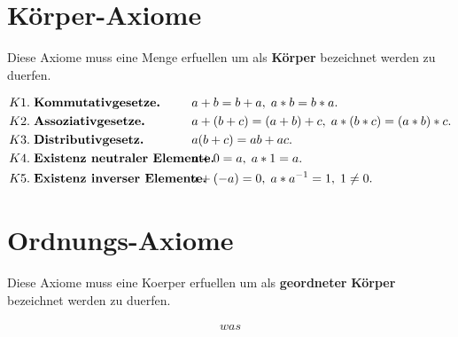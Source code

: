 \documentclass[../AbiMappe_Mathe.tex]{subfiles}
\begin{document}
\theoremstyle{nonumberplain}
\newtheorem{mytheo}{Remark}

\section{Körper-Axiome}
Diese Axiome muss eine Menge erfuellen um als \textbf{Körper} bezeichnet werden zu duerfen.

\begin{fmytheo}
\vspace{-0.5 cm}
\begin{align*}
K1.\hspace{0.3 em} &\textbf{Kommutativgesetze.}& \hspace{-1.0 cm} &a+b=b+a,\; a*b=b*a.\\
K2.\hspace{0.3 em} &\textbf{Assoziativgesetze.}& \hspace{-1.0 cm} &a+(b+c)=(a+b)+c,\; a*(b*c)=(a*b)*c.\\
K3. \hspace{0.3 em} &\textbf{Distributivgesetz.}& \hspace{-1.0 cm} &a(b+c)=ab+ac.\\
K4.  \hspace{0.3 em} &\textbf{Existenz neutraler Elemente.}& \hspace{-1.0 cm} &a+0=a,\; a*1=a.\\
K5.  \hspace{0.3 em} &\textbf{Existenz inverser Elemente.}& \hspace{-1.0 cm} &a+(-a)=0 ,\; a*a^{-1}=1,\; 1 \neq 0.
\end{align*}
\end{fmytheo}

\section{Ordnungs-Axiome}

Diese Axiome muss eine Koerper erfuellen um als \textbf{geordneter} \textbf{Körper} bezeichnet werden zu duerfen.

\begin{fmytheo}
\vspace{-0.5 cm}
\begin{align*}
was
\end{align*}
\end{fmytheo}
\end{document}
